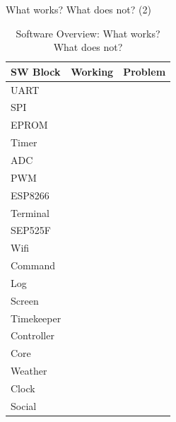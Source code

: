 \documentclass[apectratio=169]{beamer}
\begin{document}
	\begin{frame}{What works? What does not? (2)}
	\tiny
	\begin{table}[H]
	\centering
	\begin{tabular}{lll}
	\textbf{SW Block}       & \textbf{Working}& \textbf{Problem}    \\\hline
	UART            & \checkmark    &                               \\
	SPI             & \checkmark    &                               \\
	EPROM           & \checkmark    &                               \\
	Timer           & \checkmark    &                               \\
	ADC             &               &                               \\
	PWM             &               &                               \\
	ESP8266         & \checkmark    &                               \\
	Terminal        & \checkmark    &                               \\
	SEP525F         & \checkmark    &                               \\
	Wifi            &               &                               \\
	Command         & \checkmark    &                               \\
	Log             & \checkmark    &                               \\
	Screen          & \checkmark    &                               \\
	Timekeeper      & \checkmark    &                               \\
	Controller      &               &                               \\
	Core            & \checkmark    &                               \\
	Weather         & \checkmark    &                               \\
	Clock           & \checkmark    &                               \\
	Social          &               &                               \\
	\end{tabular}
	\caption{Software Overview: What works? What does not?}
	\label{tab:sw}
	\end{table}

	\end{frame}
	
\end{document}
